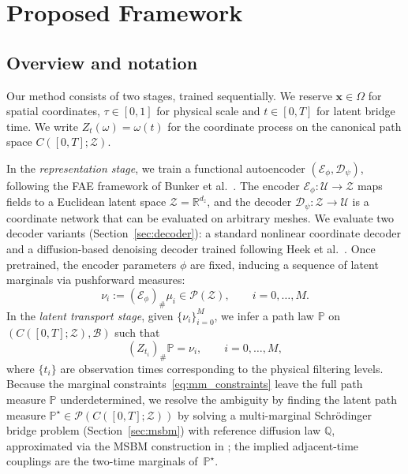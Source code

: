 \documentclass[review,onefignum,onetabnum]{siamart250211}
\newcommand{\R}{\mathbb{R}}
\newcommand{\1}{\mathbf{1}}
\newcommand{\cU}{\mathcal{U}}
\newcommand{\cZ}{\mathcal{Z}}
\newcommand{\cP}{\mathcal{P}}
\newcommand{\cE}{\mathcal{E}}
\newcommand{\cD}{\mathcal{D}}
\begin{document}
\section{Proposed Framework}\label{sec:method}

\subsection{Overview and notation}\label{sec:overview}

Our method consists of two stages, trained sequentially. We reserve $\mathbf{x}\in\Omega$ for spatial coordinates, $\tau\in[0,1]$ for physical scale and $t\in[0,T]$ for latent bridge time. We write $Z_t(\omega)=\omega(t)$ for the coordinate process on the canonical path space $C([0,T];\cZ)$.

In the \emph{representation stage}, we train a functional autoencoder $(\cE_\phi,\cD_\psi)$, following the \textsc{FAE} framework of Bunker et al.~\cite{bunker2025fae}. The encoder $\cE_\phi:\cU\to\cZ$ maps fields to a Euclidean latent space $\cZ=\R^{d_z}$, and the decoder $\cD_\psi:\cZ\to\cU$ is a coordinate network that can be evaluated on arbitrary meshes. We evaluate two decoder variants (Section~\ref{sec:decoder}): a standard nonlinear coordinate decoder and a diffusion-based denoising decoder trained following Heek et al.~\cite{heek2026ul}. Once pretrained, the encoder parameters $\phi$ are fixed, inducing a sequence of latent marginals via pushforward measures:
\begin{equation}
\nu_i := (\cE_\phi)_\#\mu_i \in \cP(\cZ),\qquad i=0,\dots,M.
\label{eq:latent_marginals}
\end{equation}
In the \emph{latent transport stage}, given $\{\nu_i\}_{i=0}^M$, we infer a path law $\mathbb{P}$ on $(C([0,T];\cZ),\mathcal{B})$ such that
\begin{equation}
(Z_{t_i})_\#\mathbb{P} = \nu_i,\qquad i=0,\dots,M,
\label{eq:mm_constraints}
\end{equation}
where $\{t_i\}$ are observation times corresponding to the physical filtering levels. Because the marginal constraints~\eqref{eq:mm_constraints} leave the full path measure $\mathbb{P}$ underdetermined, we resolve the ambiguity by finding the latent path measure $\mathbb{P}^\star\in\cP(C([0,T];\cZ))$ by solving a multi-marginal Schr\"odinger bridge problem (Section~\ref{sec:msbm}) with reference diffusion law $\mathbb{Q}$, approximated via the \textsc{MSBM} construction in \cite{park2025msbm}; the implied adjacent-time couplings are the two-time marginals of~$\mathbb{P}^\star$.
\end{document}

